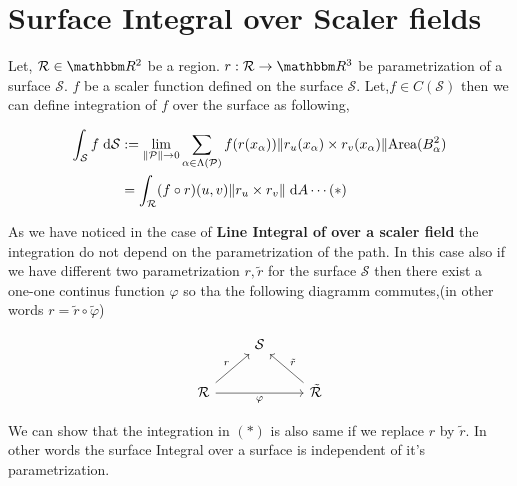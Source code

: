 \documentclass[Analysis-3]{subfiles}
\begin{document}
\section{Surface Integral over Scaler fields}

Let, $\mathcal{R} \in \R^2$ be a region. $r:\mathcal{R} \to \R^3$ be parametrization of a surface $\mathcal{S}$. $f$ be a scaler function defined on the surface $\mathcal{S}$. Let,$f \in C(\mathcal{S})$ then we can define integration of $f$ over the surface as following,

\begin{align*} 
    \int_{\mathcal{S}} f \hspace{0.1cm} \dd \mathcal{S} &:= \lim_{\norm{\mathcal{P}} \to 0} \sum_{\alpha \in \Lambda (\mathcal{P})} f(r(x_{\alpha})) \norm{r_u(x_{\alpha}) \times r_v(x_{\alpha})} \text{Area}(B_{\alpha}^2) \\
    &= \int_{\mathcal{R}} (f \circ r)(u,v) \norm{r_u \times r_v} \hspace{0.1cm} \dd A \cdots (*)
\end{align*}

As we have noticed in the case of \textbf{Line Integral of over a scaler field} the integration do not depend on the parametrization of the path. In this case also if we have different two parametrization $r,\tilde{r}$ for the surface $\mathcal{S}$ then there exist a one-one continus function $\varphi$ so tha the following diagramm commutes,(in other words $r = \tilde{r} \circ \tilde{\varphi}$)

\[\begin{tikzcd}
	& {\mathcal{S}} \\
	{\mathcal{R}} && {\tilde{\mathcal{R}}}
	\arrow["r", from=2-1, to=1-2]
	\arrow["{\tilde{r}}"', from=2-3, to=1-2]
	\arrow["\varphi"', from=2-1, to=2-3]
\end{tikzcd}\]
 
We can show that the integration in $(*)$ is also same if we replace $r$ by $\tilde{r}$. In other words the surface Integral over a surface is independent of it's parametrization.
\end{document}
